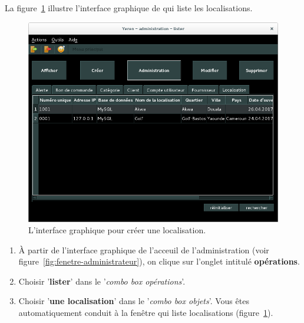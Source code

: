 
\newpage
{}

La figure~\ref{fig:admin-localisations-lister} illustre
l'interface graphique de \yeroth qui liste les localisations.\\

\begin{figure}[!htpb]
	\centering
	\includegraphics[scale=0.45]{images/localisation-lister.png}
	\caption{L'interface graphique pour cr\'eer une localisation.}
	\label{fig:admin-localisations-lister}
\end{figure}

\begin{enumerate}[1)]
	\item \`A partir de l'interface graphique de l'acceuil de
		l'administration (voir figure~\ref{fig:fenetre-administrateur}),
		on clique sur l'onglet intitul\'e \textbf{op\'erations}. 
		
	\item Choisir '\textbf{lister}' dans le '\emph{combo box
		op\'erations}'.
		
	\item Choisir '\textbf{une localisation}' dans le
		'\emph{combo box objets}'. Vous \^etes automatiquement
		conduit \`a la fen\^etre qui liste localisations
		(figure~\ref{fig:admin-localisations-lister}).
\end{enumerate}

